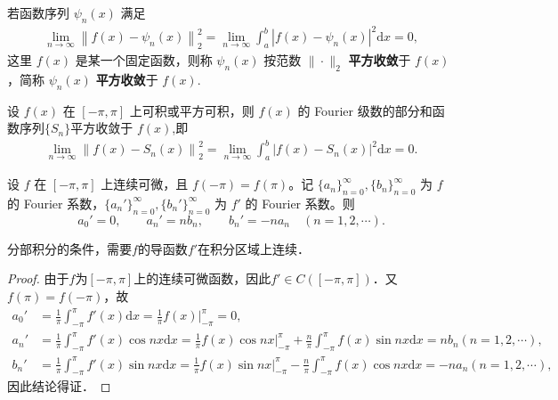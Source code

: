 \documentclass[../../main.tex]{subfiles}%
\begin{document}
\begin{definition}
若函数序列 $\psi_n(x)$ 满足
\begin{align*}
\lim_{n\rightarrow \infty} \left\| f\left( x \right) -\psi _n\left( x \right) \right\| _{2}^{2}=\lim_{n\rightarrow \infty} \int_a^b{\left| f\left( x \right) -\psi _n\left( x \right) \right|^2\mathrm{d}x}=0,
\end{align*}
这里 $f(x)$ 是某一个固定函数，则称 $\psi_n(x)$ 按范数 $\|\cdot\|_2$ \textbf{平方收敛}于 $f(x)$，简称 $\psi_n(x)$ \textbf{平方收敛}于 $f(x)$.
\end{definition}

\begin{corollary}[Fourier级数的平方收敛性质]
设 $f(x)$ 在 $[-\pi, \pi]$ 上可积或平方可积，则 $f(x)$ 的 Fourier 级数的部分和函数序列$\{S_n\}$平方收敛于 $f(x)$,即
\begin{align*}
\lim_{n\rightarrow \infty} \left\| f\left( x \right) -S_n\left( x \right) \right\| _{2}^{2}=\lim_{n\rightarrow \infty} \int_a^b{\left| f\left( x \right) -S_n\left( x \right) \right|^2\mathrm{d}x}=0.
\end{align*}
\end{corollary}

\begin{lemma}\label{lemma:Fourier级数与其导函数的系数关系}
设 $f$ 在 $[-\pi,\pi]$ 上连续可微，且 $f(-\pi)=f(\pi)$。记 $\{a_n\}_{n=0}^{\infty},\{b_n\}_{n=0}^{\infty}$ 为 $f$ 的 Fourier 系数，$\{a_n'\}_{n=0}^{\infty},\{b_n'\}_{n=0}^{\infty}$ 为 $f'$ 的 Fourier 系数。则
\[
a_0' = 0,\qquad a_n' = n b_n,\qquad b_n' = -n a_n\quad (n=1,2,\cdots).
\]
\end{lemma}
\begin{remark}
分部积分的条件，需要$f$的导函数$f'$在积分区域上连续．
\end{remark}
\begin{proof}
由于$f$为$[-\pi,\pi]$上的连续可微函数，因此$f'\in C([-\pi,\pi])$．又$f(\pi)=f(-\pi)$，故
\begin{align*}
a_{0}'&=\frac{1}{\pi}\int_{-\pi}^{\pi}f'(x)\mathrm{d}x=\frac{1}{\pi}f(x)\Big|_{-\pi}^{\pi}=0,\\
a_{n}'&=\frac{1}{\pi}\int_{-\pi}^{\pi}f'(x)\cos nx\mathrm{d}x=\frac{1}{\pi}f(x)\cos nx\Big|_{-\pi}^{\pi}+\frac{n}{\pi}\int_{-\pi}^{\pi}f(x)\sin nx\mathrm{d}x=nb_n(n=1,2,\cdots),\\
b_{n}'&=\frac{1}{\pi}\int_{-\pi}^{\pi}f'(x)\sin nx\mathrm{d}x=\frac{1}{\pi}f(x)\sin nx\Big|_{-\pi}^{\pi}-\frac{n}{\pi}\int_{-\pi}^{\pi}f(x)\cos nx\mathrm{d}x=-na_n(n=1,2,\cdots),
\end{align*}
因此结论得证．\end{proof}
\end{document}
